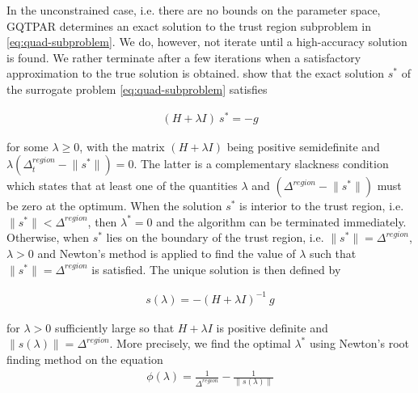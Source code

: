 In the unconstrained case, i.e. there are no bounds on the parameter space, GQTPAR determines an exact solution to the trust region
subproblem in \ref{eq:quad-subproblem}. We do, however, not iterate until a high-accuracy solution is found. We rather terminate after a few iterations when a satisfactory approximation to the true solution is obtained.\cite{More1983} show that the exact solution $s^*$ of the surrogate problem \ref{eq:quad-subproblem} satisfies



\begin{align}
    ( H + \lambda I ) \ s^* = - g
    \label{eq:exact-solution}
\end{align}

\noindent for some $\lambda \geq 0$, with the matrix $( H + \lambda I )$ being positive semidefinite and
$\lambda (\Delta^{region}_{t}  - \lVert s^* \rVert) = 0$. The latter is a complementary slackness condition
which states that at least one of the quantities $\lambda$ and $(\Delta^{region}  - \lVert s^* \rVert)$
must be zero at the optimum.
When the solution $s^*$ is interior to the trust region, i.e. $\lVert s^* \rVert < \Delta^{region}$,
then $\lambda^*= 0$ and the algorithm can be terminated immediately.
Otherwise, when $s^*$ lies on the boundary of the trust region, i.e. $\lVert s^* \rVert = \Delta^{region}$,
$\lambda > 0$ and Newton's method is applied to find the value of $\lambda$ such that
$\lVert s^* \rVert = \Delta^{region}$ is satisfied.
The unique solution is then defined by

\begin{align}
    s (\lambda) = -(H + \lambda I)^{-1} \ g
    \label{eq:boundary-solution}
\end{align}

\noindent for $\lambda> 0$ sufficiently large so that $H + \lambda I$ is positive definite and $ \lVert s (\lambda) \rVert = \Delta^{region}$.
More precisely, we find the optimal $\lambda^*$ using Newton's root finding method on the equation
\begin{align}
    \phi(\lambda)=\frac{1}{\Delta^{region}}-\frac{1}{\|s(\lambda)\|}
\end{align}

